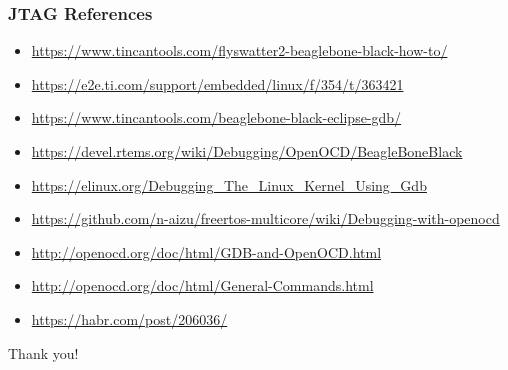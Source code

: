 \documentclass[aspectratio=169,usenames,dvipsnames]{beamer}
\begin{document}
\begin{frame}
  \frametitle{JTAG References}
  \begin{itemize}
    \item \url{https://www.tincantools.com/flyswatter2-beaglebone-black-how-to/}
    \item \url{https://e2e.ti.com/support/embedded/linux/f/354/t/363421}
    \item \url{https://www.tincantools.com/beaglebone-black-eclipse-gdb/}
    \item \url{https://devel.rtems.org/wiki/Debugging/OpenOCD/BeagleBoneBlack}
    \item \url{https://elinux.org/Debugging\_The\_Linux\_Kernel\_Using\_Gdb}
    \item \url{https://github.com/n-aizu/freertos-multicore/wiki/Debugging-with-openocd}
    \item \url{http://openocd.org/doc/html/GDB-and-OpenOCD.html}
    \item \url{http://openocd.org/doc/html/General-Commands.html}
    \item \url{https://habr.com/post/206036/}
  \end{itemize}
  \vspace*{-10mm}
\end{frame}

\begin{frame}[standout]
  Thank you!
\end{frame}
\end{document}
